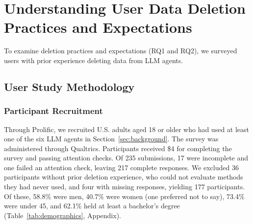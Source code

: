     \section{Understanding User Data Deletion Practices and Expectations}
    \label{sec:user_study}



    To examine deletion practices and expectations (RQ1 and RQ2), we surveyed users with prior experience deleting data from LLM agents.

    \subsection{User Study Methodology}

    \subsubsection{Participant Recruitment}
    Through Prolific, we recruited U.S. adults aged 18 or older who had used at least one of the six LLM agents in Section~\ref{sec:background}.
    The survey was administered through Qualtrics.
    Participants received \$4 for completing the survey and passing attention checks.
    Of 235 submissions, 17 were incomplete and one failed an attention check, leaving 217 complete responses.
    We excluded 36 participants without prior deletion experience, who could not evaluate methods they had never used, and four with missing responses, yielding 177 participants.
    Of these, 58.8\% were men, 40.7\% were women (one preferred not to say), 73.4\% were under 45, and 62.1\% held at least a bachelor's degree (Table~\ref{tab:demographics}, Appendix). 






